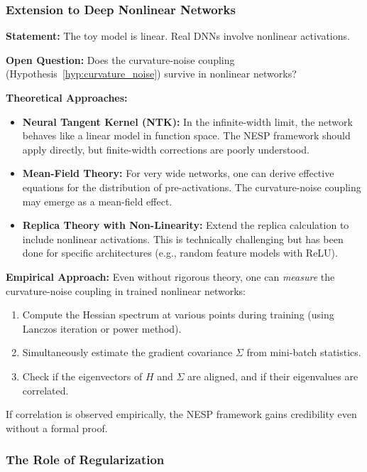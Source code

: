 \documentclass[
  journal=largetwo,
  year=2025,
  volume=37,
]{cup-journal}
\begin{document}
\subsubsection{Extension to Deep Nonlinear Networks}

\textbf{Statement:} The toy model is linear. Real DNNs involve nonlinear activations.

\textbf{Open Question:} Does the curvature-noise coupling (Hypothesis~\ref{hyp:curvature_noise}) survive in nonlinear networks?

\textbf{Theoretical Approaches:}
\begin{itemize}
    \item \textbf{Neural Tangent Kernel (NTK):} In the infinite-width limit, the network behaves like a linear model in function space. The NESP framework should apply directly, but finite-width corrections are poorly understood.
    \item \textbf{Mean-Field Theory:} For very wide networks, one can derive effective equations for the distribution of pre-activations. The curvature-noise coupling may emerge as a mean-field effect.
    \item \textbf{Replica Theory with Non-Linearity:} Extend the replica calculation to include nonlinear activations. This is technically challenging but has been done for specific architectures (e.g., random feature models with ReLU).
\end{itemize}

\textbf{Empirical Approach:} Even without rigorous theory, one can \textit{measure} the curvature-noise coupling in trained nonlinear networks:
\begin{enumerate}
    \item Compute the Hessian spectrum at various points during training (using Lanczos iteration or power method).
    \item Simultaneously estimate the gradient covariance $\Sigma$ from mini-batch statistics.
    \item Check if the eigenvectors of $H$ and $\Sigma$ are aligned, and if their eigenvalues are correlated.
\end{enumerate}
If correlation is observed empirically, the NESP framework gains credibility even without a formal proof.

\subsubsection{The Role of Regularization}
\end{document}
